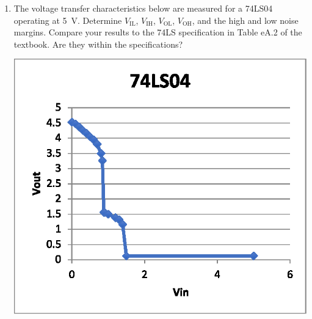 \documentclass{ps}
\date{2019 January}
\author{}
\begin{document}
\begin{enumerate}
\item The voltage transfer characteristics below are measured for a
  74LS04 operating at \SI{5}{\V}.  Determine \(V_\mathrm{IL}\),
  \(V_\mathrm{IH}\), \(V_\mathrm{OL}\), \(V_\mathrm{OH}\), and the
  high and low noise margins.  Compare your results to the 74LS
  specification in Table eA.2 of the textbook.  Are they within the
  specifications?
  \begin{center}
    \includegraphics{figures/01.eps}
  \end{center}
  \begin{solution}
  \end{solution}


\end{enumerate}
\end{document}
